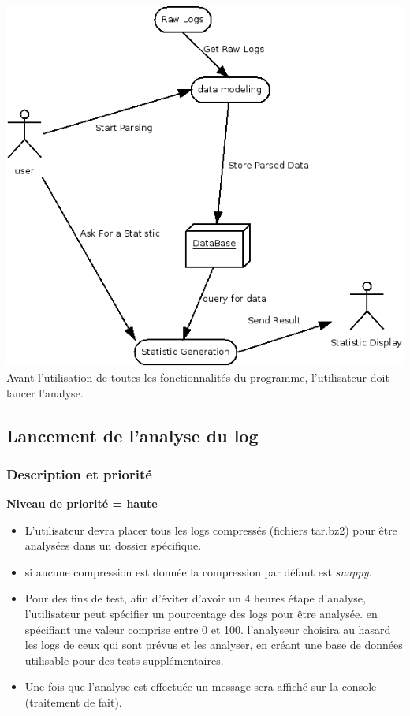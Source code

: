 \documentclass{scrreprt}
\begin{document}
\includegraphics[scale=0.45,keepaspectratio]{diaRessources/UseCaseParsing}\\
Avant l'utilisation de toutes les fonctionnalités du programme, l'utilisateur doit lancer l'analyse.
\subsection{Lancement de l'analyse du log}
\subsubsection{Description et priorité}
\textbf{Niveau de priorité = haute}\\
\begin{itemize}
  \item L'utilisateur devra placer tous les logs compressés (fichiers tar.bz2) pour être analysées dans un dossier spécifique.
  \item si aucune compression est donnée la compression par défaut est \textit{snappy}.
    \item Pour des fins de test, afin d'éviter d'avoir un 4 heures étape d'analyse, l'utilisateur peut spécifier un pourcentage des logs pour être analysée. en spécifiant une valeur comprise entre 0 et 100. l'analyseur choisira au hasard les logs de ceux qui sont prévus et les analyser, en créant une base de données utilisable pour des tests supplémentaires.
    \item Une fois que l'analyse est effectuée un message sera affiché sur la console (traitement de fait).

\end{itemize}
\end{document}
